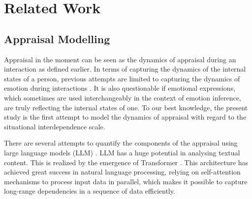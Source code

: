 \section{Related Work}
\subsection{Appraisal Modelling} \label{app_model}

Appraisal in the moment can be seen as the dynamics of appraisal during an interaction as defined earlier. In terms of capturing the dynamics of the internal states of a person, previous attempts are limited to capturing the dynamics of emotion during interactions \cite{}. It is also questionable if emotional expressions, which sometimes are used interchangeably in the context of emotion inference, are truly reflecting the internal states of one. To our best knowledge, the present study is the first attempt to model the dynamics of appraisal with regard to the situational interdependence scale. 

There are several attempts to quantify the components of the appraisal using large language models (LLM) \cite{broekens2023fine, feng2023affect, tak2023gpt, yongsatianchot2023investigating, zhan-etal-2023-evaluating}. LLM has a huge potential in analysing textual content. This is realized by the emergence of Transformer \cite{vaswani2017attention}. This architecture has achieved great success in natural language processing, relying on self-attention mechanisms to process input data in parallel, which makes it possible to capture long-range dependencies in a sequence of data efficiently. 

